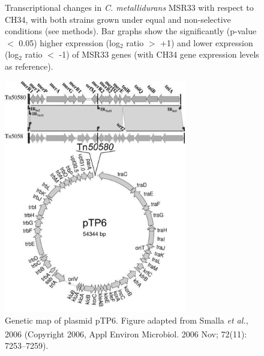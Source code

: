 \begin{figure} [ht]
\begin{center}
\begin{subfigure}{0.48\textwidth}
     \label{fig:4b}
  \end{subfigure}
\end{center}
\caption{Transcriptional changes in\textit{ C. metallidurans} MSR33 with respect to CH34, with both strains grown under equal and non-selective conditions (see methods). Bar graphs show the significantly (p-value $<$ 0.05) higher expression (log$_2$ ratio $>$ +1) and lower expression (log$_2$ ratio $<$ -1) of MSR33 genes (with CH34 gene expression levels as reference). 
}
\label{chapter3-fig2}%
\end{figure}

\begin{figure} [ht] 
\begin{center}
\includegraphics[width=300px]{chapter3/chapter/figs/genes-09-00551-g003.png}
\end{center}
\caption{Genetic map of plasmid pTP6. Figure adapted from Smalla \textit{et al.}, 2006 (Copyright\textsuperscript{\tiny\textcopyright} 2006, Appl Environ Microbiol. 2006 Nov; 72(11): 7253–7259).   
}
\label{chapter3-fig3}%
\end{figure}


